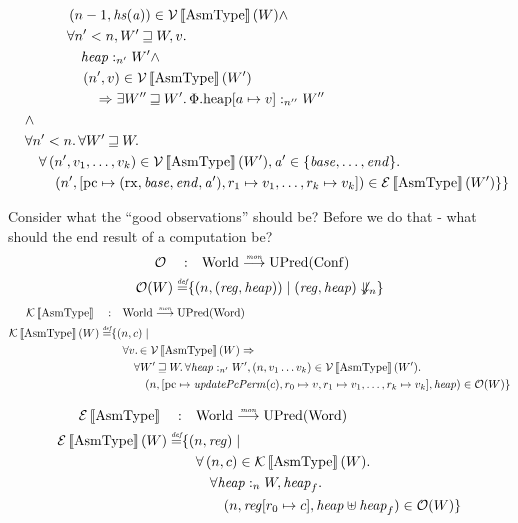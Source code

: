 \documentclass{article}
\newcommand{\update}[2]{[#1 \mapsto #2]}
\newcommand{\sem}[1]{\left\llbracket #1 \right\rrbracket}
\newcommand{\monfun}{\stackrel{\textit{\tiny{mon}}}{\longrightarrow}}
\newcommand{\defeq}{\stackrel{\textit{\tiny{def}}}{=}}
\newcommand{\var}[1]{\mathit{#1}}
\newcommand{\pcreg}{\mathrm{pc}}
\newcommand{\addr}{\var{a}}
\newcommand{\start}{\var{base}}
\newcommand{\addrend}{\var{end}}
\newcommand{\reg}{\var{reg}}
\newcommand{\heapseg}{\var{hs}}
\newcommand{\heap}{\var{heap}}
\newcommand{\plainproj}[1]{\mathrm{#1}}
\newcommand{\memheap}[1][\Phi]{#1.\plainproj{heap}}
\newcommand{\plainfun}[1]{\mathit{#1}}
\newcommand{\updatePcPerm}[1]{\plainfun{updatePcPerm}(#1)}
\newcommand{\future}{\mathbin{\sqsupseteq}}
\newcommand{\heapSat}[3][\heap]{#1 :_{#2} #3}
\newcommand{\asmType}{\plaindom{AsmType}}
\newcommand{\plaindom}[1]{\mathrm{#1}}
\newcommand{\Words}{\plaindom{Word}}
\newcommand{\Confs}{\plaindom{Conf}}
\newcommand{\Worlds}{\plaindom{World}}
\newcommand{\UPred}[1]{\plaindom{UPred}(#1)}
\newcommand{\intr}[2]{\mathcal{#1}\sem{#2}}
\newcommand{\valueintr}[1]{\intr{V}{#1}}
\newcommand{\exprintr}[1]{\intr{E}{#1}}
\newcommand{\contintr}[1]{\intr{K}{#1}}
\newcommand{\stdvr}{\valueintr{\asmType}}
\newcommand{\stder}{\exprintr{\asmType}}
\newcommand{\stdkr}{\contintr{\asmType}}
\newcommand{\observations}{\mathcal{O}}
\newcommand{\npair}[2][n]{\left(#1,#2 \right)}
\newcommand{\plainperm}[1]{\mathrm{#1}}
\newcommand{\exec}{\plainperm{rx}}
\newcommand{\diverge}[1][n]{\not\Downarrow_{#1}}
\begin{document}
\begin{align*}
                   & \qquad \qquad   \npair[n-1]{\heapseg(\addr)} \in \stdvr(W) \land \\
                   & \qquad \qquad   \forall n' < n, W' \future W, v \ldotp \\
                   & \qquad \qquad \quad \heapSat{n'}{W'} \land \\
                   & \qquad \qquad \quad \npair[n']{v} \in \stdvr(W') \\
                   & \qquad \qquad \qquad  \Rightarrow \exists W'' \future W' \ldotp \heapSat[\memheap\update{a}{v}]{n''}{W''} \\
                   & \quad \land \\
                   & \quad \forall n' < n \ldotp \forall W' \future W \ldotp \\
                   & \qquad \forall \npair[n']{v_1,\dots,v_k} \in \stdvr(W'),\addr' \in \{\start, \dots, \addrend \} \ldotp \\
                   & \qquad \quad \npair[n']{[\pcreg \mapsto (\exec,\start,\addrend,\addr'), r_1 \mapsto v_1, \dots , r_k \mapsto v_k]} \in \stder(W') \}
\}
\end{align*}

Consider what the ``good observations'' should be? Before we do that - what should the end result of a computation be?
\begin{align*}
  \observations \quad : & \quad  \Worlds \monfun \UPred{\Confs} \\%
  \observations (W) \defeq & \{ \npair{(\reg,\heap)} \mid (\reg,\heap) \diverge \}
\end{align*}
\begin{align*}
  \stdkr \quad : & \quad  \Worlds \monfun \UPred{\Words} \\%
  \stdkr(W) \defeq & \{ \npair{c} \mid \\
                   & \quad \forall v\ldotp \in \stdvr(W) \Rightarrow \\
                   & \qquad  \forall W' \future W\ldotp %
                     \forall \heapSat[\heap]{n'}{W'}, \npair{v_1 \dots v_k} \in \stdvr(W') \ldotp \\
                   & \qquad \quad (n,[\pcreg \mapsto \updatePcPerm{c},r_0 \mapsto v,r_1 \mapsto v_1,\dots, r_k \mapsto v_k], \heap) \in \observations(W) \}
\end{align*}

\begin{align*}
  \stder \quad : & \quad \Worlds \monfun \UPred{\Words} \\%
  \stder(W) \defeq & \{ \npair{\reg} \mid \\
                   & \quad \forall \npair{c} \in \stdkr(W) \ldotp \\
                   & \qquad  \forall \heapSat[\heap]{n}{W}, \heap_f \ldotp \\
                   & \qquad \quad (n,\reg\update{r_0}{c},\heap \uplus \heap_f) \in \observations(W) \}
\end{align*}
\end{document}
